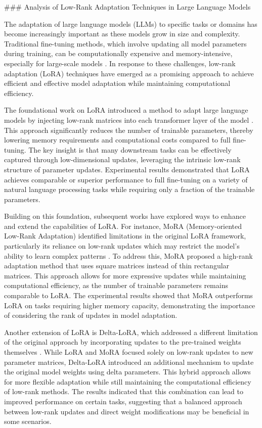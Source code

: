 \documentclass[conference]{IEEEtran}
\begin{document}
### Analysis of Low-Rank Adaptation Techniques in Large Language Models

The adaptation of large language models (LLMs) to specific tasks or domains has become increasingly important as these models grow in size and complexity. Traditional fine-tuning methods, which involve updating all model parameters during training, can be computationally expensive and memory-intensive, especially for large-scale models \cite{b1}. In response to these challenges, low-rank adaptation (LoRA) techniques have emerged as a promising approach to achieve efficient and effective model adaptation while maintaining computational efficiency.

The foundational work on LoRA introduced a method to adapt large language models by injecting low-rank matrices into each transformer layer of the model \cite{b1}. This approach significantly reduces the number of trainable parameters, thereby lowering memory requirements and computational costs compared to full fine-tuning. The key insight is that many downstream tasks can be effectively captured through low-dimensional updates, leveraging the intrinsic low-rank structure of parameter updates. Experimental results demonstrated that LoRA achieves comparable or superior performance to full fine-tuning on a variety of natural language processing tasks while requiring only a fraction of the trainable parameters.

Building on this foundation, subsequent works have explored ways to enhance and extend the capabilities of LoRA. For instance, MoRA (Memory-oriented Low-Rank Adaptation) identified limitations in the original LoRA framework, particularly its reliance on low-rank updates which may restrict the model's ability to learn complex patterns \cite{b2}. To address this, MoRA proposed a high-rank adaptation method that uses square matrices instead of thin rectangular matrices. This approach allows for more expressive updates while maintaining computational efficiency, as the number of trainable parameters remains comparable to LoRA. The experimental results showed that MoRA outperforms LoRA on tasks requiring higher memory capacity, demonstrating the importance of considering the rank of updates in model adaptation.

Another extension of LoRA is Delta-LoRA, which addressed a different limitation of the original approach by incorporating updates to the pre-trained weights themselves \cite{b3}. While LoRA and MoRA focused solely on low-rank updates to new parameter matrices, Delta-LoRA introduced an additional mechanism to update the original model weights using delta parameters. This hybrid approach allows for more flexible adaptation while still maintaining the computational efficiency of low-rank methods. The results indicated that this combination can lead to improved performance on certain tasks, suggesting that a balanced approach between low-rank updates and direct weight modifications may be beneficial in some scenarios.
\end{document}
